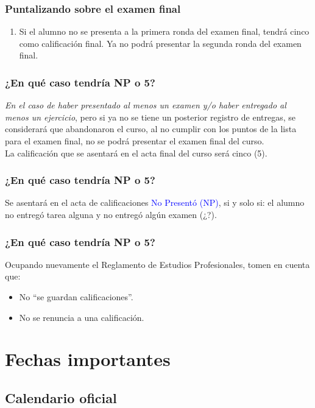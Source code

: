 \documentclass[12pt]{beamer}
\begin{document}
\begin{frame}
\frametitle{Puntalizando sobre el examen final}
\begin{enumerate}[<+->]
\conti    
\item Si el alumno no se presenta a la primera ronda del examen final, tendrá cinco como calificación final. Ya no podrá presentar la segunda ronda del examen final.
\end{enumerate}
\end{frame}
\begin{frame}
\frametitle{\textbf{¿En qué caso tendría NP o 5?}}
\emph{En el caso de haber presentado al menos un examen y/o haber entregado al menos un ejercicio}, \pause pero si ya no se tiene un posterior registro de entregas, se considerará que abandonaron el curso, al no cumplir con los puntos de la lista para el examen final, no se podrá presentar el examen final del curso.
\\
\bigskip
\pause
La calificación que se asentará en el acta final del curso será \textcolor{lava}{cinco (5)}.
\end{frame}
\begin{frame}
\frametitle{\textbf{¿En qué caso tendría NP o 5?}}
Se asentará en el acta de calificaciones \textcolor{blue}{No Presentó (NP)}, si y solo si: el alumno no entregó tarea alguna y no entregó algún examen (¿?).
\end{frame}
\begin{frame}
\frametitle{\textbf{¿En qué caso tendría NP o 5?}}
Ocupando nuevamente el Reglamento de Estudios Profesionales, tomen en cuenta que:
\pause
\begin{itemize}[<+->]
\item[\ding{212}] No \enquote{se guardan calificaciones}.
\item[\ding{212}] No se renuncia a una calificación.
\end{itemize}
\end{frame}

\section{Fechas importantes}
\subsection{Calendario oficial}
\end{document}
